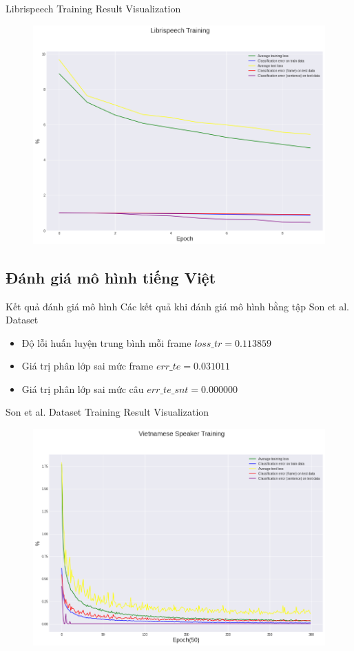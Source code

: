 \documentclass[notheorems, aspectratio=54]{beamer}
\begin{document}
\begin{frame}{Librispeech Training Result Visualization}
	\begin{figure}[H]
		\includegraphics[width=0.8\linewidth]{result/sincnet_librispeech_plot.png}
		\label{fig:writing-thesis}
	\end{figure}
\end{frame}
\subsection{Đánh giá mô hình \textbf{tiếng Việt}}
\begin{frame}{Kết quả đánh giá mô hình}
	Các kết quả khi đánh giá mô hình bằng tập Son et al. Dataset
	\begin{itemize}
		\item Độ lỗi huấn luyện trung bình mỗi frame $loss\_tr=0.113859$
		\item Giá trị phân lớp sai mức frame $err\_te=0.031011$
		\item Giá trị phân lớp sai mức câu $err\_te\_snt =0.000000$
	\end{itemize}
\end{frame}
\begin{frame}{Son et al. Dataset Training Result Visualization}
	\begin{figure}[H]
		\includegraphics[width=0.8\linewidth]{result/sincnet_vietnamese_plot.png}
		\label{fig:writing-thesis}
	\end{figure}
\end{frame}
\end{document}
